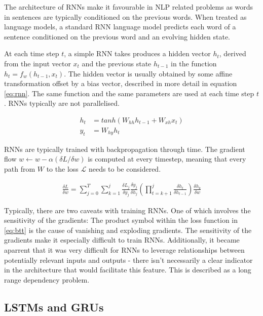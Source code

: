 \documentclass[12pt,twoside]{report}
\begin{document}
The architecture of RNNs make it favourable in NLP related problems as words in sentences are typically conditioned on the previous words. When treated as language models, a standard RNN language model predicts each word of a sentence conditioned on the previous word and an evolving hidden state.

At each time step $t$, a simple RNN takes produces a hidden vector $h_t$, derived from the input vector $x_t$ and the previous state $h_{t-1}$ in the function $h_t = f_w(h_{t-1}, x_t)$. The hidden vector is usually obtained by some affine transformation offset by a bias vector, described in more detail in equation \ref{eq:rnn}. The same function and the same parameters are used at each time step $t$. RNNs typically are not parallelised. 

\begin{equation}
	\label{eq:rnn}
	\begin{aligned}
		h_t &= tanh(W_{hh}h_{t-1}+W_{xh}x_t)
	\\
	y_t &= W_{hy}h_t
	\end{aligned}
	\end{equation}

RNNs are typically trained with backpropagation through time. The gradient flow $w \leftarrow w - \alpha ({\delta L}/{\delta w})$ is computed at every timestep, meaning that every path from $W$ to the loss $\mathcal{L}$ needs to be considered.

\begin{equation}
	\label{eq:btt}
	\begin{aligned}
		\frac{\delta L}{\delta w} = \sum^T_{j=0}\sum^j_{k=1}\frac{\delta L_j}{\delta y_j}\frac{\delta y_j}{\delta h_j}(\prod^j_{t=k+1}\frac{\delta h_t}{\delta h_{t-1}})\frac{\delta h_k}{\delta w}
	\end{aligned}
	\end{equation}


Typically, there are two caveats with training RNNs. One of which involves the sensitivity of the gradients: The product symbol within the loss function in \ref{eq:btt} is the cause of vanishing and exploding gradients. The sensitivity of the gradients make it especially difficult to train RNNs. 
Additionally, it became aparrent that it was very difficult for RNNs to leverage relationships between potentially relevant inputs and outputs - there isn't necessarily a clear indicator in the architecture that would facilitate this feature. This is described as a long range dependency problem.

\subsection{LSTMs and GRUs} 
\end{document}
